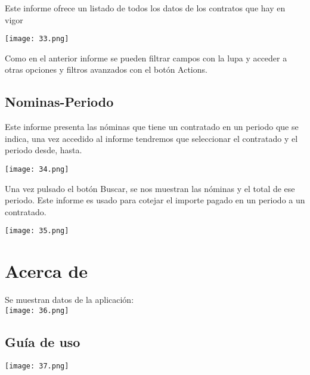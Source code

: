 Este informe ofrece un listado de todos los datos de los contratos que hay en vigor

\texttt{[image: 33.png]}

Como en el anterior informe se pueden filtrar campos con la lupa y
acceder a otras opciones y filtros avanzados con el botón Actions.

\subsection{Nominas-Periodo}\label{nominas-periodo}

Este informe presenta las nóminas que tiene un contratado en un periodo que se indica, una vez accedido al informe tendremos que seleccionar el contratado y el periodo desde, hasta.

\texttt{[image: 34.png]}

Una vez pulsado el botón Buscar, se nos muestran las nóminas y el total de ese periodo. Este informe es usado para cotejar el importe pagado en un periodo a un contratado.

\texttt{[image: 35.png]}

\section{Acerca de}\label{acerca-de}

Se muestran datos de la aplicación:\\
\texttt{[image: 36.png]}

\subsection{Guía de uso}\label{guuxeda-de-uso}

\texttt{[image: 37.png]}
